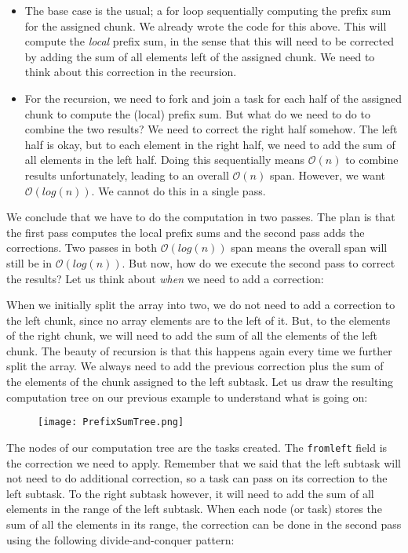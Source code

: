 \documentclass[main.tex]{subfiles}
\begin{document}
\begin{itemize}
  \item The base case is the usual; a for loop sequentially computing the prefix sum for the assigned chunk. We already wrote the code for this above. This will compute the \textit{local} prefix sum, in the sense that this will need to be corrected by adding the sum of all elements left of the assigned chunk. We need to think about this correction in the recursion.
  \item For the recursion, we need to fork and join a task for each half of the assigned chunk to compute the (local) prefix sum. But what do we need to do to combine the two results? We need to correct the right half somehow. The left half is okay, but to each element in the right half, we need to add the sum of all elements in the left half. Doing this sequentially means \(\mathcal{O}(n)\) to combine results unfortunately, leading to an overall \(\mathcal{O}(n)\) span. However, we want \(\mathcal{O}(log(n))\). We cannot do this in a single pass.
\end{itemize}

\noindent We conclude that we have to do the computation in two passes. The plan is that the first pass computes the local prefix sums and the second pass adds the corrections. Two passes in both \(\mathcal{O}(log(n))\) span means the overall span will still be in \(\mathcal{O}(log(n))\). But now, how do we execute the second pass to correct the results? Let us think about \textit{when} we need to add a correction:

When we initially split the array into two, we do not need to add a correction to the left chunk, since no array elements are to the left of it. But, to the elements of the right chunk, we will need to add the sum of all the elements of the left chunk. The beauty of recursion is that this happens again every time we further split the array. We always need to add the previous correction plus the sum of the elements of the chunk assigned to the left subtask. Let us draw the resulting computation tree on our previous example to understand what is going on:

\begin{figure}[H]
    \centering
    \texttt{[image: PrefixSumTree.png]}
\end{figure}

\noindent The nodes of our computation tree are the tasks created. The \texttt{fromleft} field is the correction we need to apply. Remember that we said that the left subtask will not need to do additional correction, so a task can pass on its correction to the left subtask. To the right subtask however, it will need to add the sum of all elements in the range of the left subtask. When each node (or task) stores the sum of all the elements in its range, the correction can be done in the second pass using the following divide-and-conquer pattern:
\end{document}
